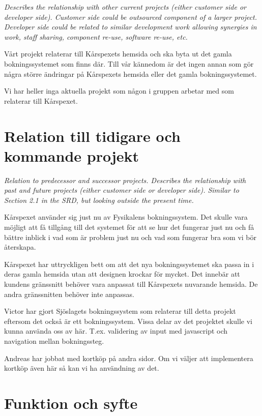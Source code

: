 \documentclass[a4paper, twoside, 11pt, titlepage]{article}
\begin{document}
\emph{Describes the relationship with other current projects (either customer side or developer side). Customer side could be outsourced component of a larger project. Developer side could be related to similar development work allowing synergies in work, staff sharing, component re-use, software re-use, etc.}

Vårt projekt relaterar till Kårspexets hemsida och ska byta ut det gamla bokningssystemet som finns där. Till vår kännedom är det ingen annan som gör några större ändringar på Kårspexets hemsida eller det gamla bokningssystemet.

Vi har heller inga aktuella projekt som någon i gruppen arbetar med som relaterar till Kårspexet.

\clearpage
\section{Relation till tidigare och kommande projekt}


\emph{Relation to predecessor and successor projects. Describes the relationship with past and future projects (either customer side or developer side). Similar to Section 2.1 in the SRD, but looking outside the present time.}

Kårspexet använder sig just nu av Fysikalens bokningssystem. Det skulle vara möjligt att få tillgång till det systemet för att se hur det fungerar just nu och få bättre inblick i vad som är problem just nu och vad som fungerar bra som vi bör återskapa.

Kårspexet har uttryckligen bett om att det nya bokningssystemet ska passa in i deras gamla hemsida utan att designen krockar för mycket. Det innebär att kundens gränssnitt behöver vara anpassat till Kårspexets nuvarande hemsida. De andra gränssnitten behöver inte anpassas.

Victor har gjort Sjöslagets bokningssystem som relaterar till detta projekt eftersom det också är ett bokningssystem. Vissa delar av det projektet skulle vi kunna använda oss av här. T.ex. validering av input med javascript och navigation mellan bokningssteg.

Andreas har jobbat med kortköp på andra sidor. Om vi väljer att implementera kortköp även här så kan vi ha användning av det.

\clearpage
\section{Funktion och syfte}
\end{document}
